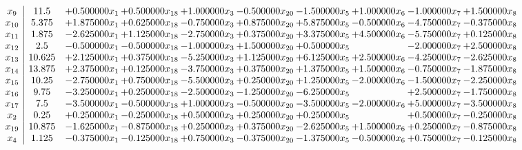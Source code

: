 \documentclass[10pt]{article}
\begin{document}
 \[\begin{array}{c| c c@{\hskip 2pt} c@{\hskip 2pt} c@{\hskip 2pt} c@{\hskip 2pt} c@{\hskip 2pt} c@{\hskip 2pt} c@{\hskip 2pt} c@{\hskip 2pt} }
 x_{9}   &  11.5 & + 0.500000 x_{1} & + 0.500000 x_{18} & + 1.000000 x_{3} & -0.500000 x_{20} & -1.500000 x_{5} & + 1.000000 x_{6} & -1.000000 x_{7} & + 1.500000 x_{8}\\
 x_{10}   &  5.375 & + 1.875000 x_{1} & + 0.625000 x_{18} & -0.750000 x_{3} & + 0.875000 x_{20} & + 5.875000 x_{5} & -0.500000 x_{6} & -4.750000 x_{7} & -0.375000 x_{8}\\
 x_{11}   &  1.875 & -2.625000 x_{1} & + 1.125000 x_{18} & -2.750000 x_{3} & + 0.375000 x_{20} & + 3.375000 x_{5} & + 4.500000 x_{6} & -5.750000 x_{7} & + 0.125000 x_{8}\\
 x_{12}   &  2.5 & -0.500000 x_{1} & -0.500000 x_{18} & -1.000000 x_{3} & + 1.500000 x_{20} & + 0.500000 x_{5} &   & -2.000000 x_{7} & + 2.500000 x_{8}\\
 x_{13}   &  10.625 & + 2.125000 x_{1} & + 0.375000 x_{18} & -5.250000 x_{3} & + 1.125000 x_{20} & + 6.125000 x_{5} & + 2.500000 x_{6} & -4.250000 x_{7} & -2.625000 x_{8}\\
 x_{14}   &  13.875 & + 2.375000 x_{1} & + 0.125000 x_{18} & -3.750000 x_{3} & + 0.375000 x_{20} & + 1.375000 x_{5} & + 1.500000 x_{6} & -0.750000 x_{7} & -1.875000 x_{8}\\
 x_{15}   &  10.25 & -2.750000 x_{1} & + 0.750000 x_{18} & -5.500000 x_{3} & + 0.250000 x_{20} & + 1.250000 x_{5} & -2.000000 x_{6} & -1.500000 x_{7} & -2.250000 x_{8}\\
 x_{16}   &  9.75 & -3.250000 x_{1} & + 0.250000 x_{18} & -2.500000 x_{3} & -1.250000 x_{20} & -6.250000 x_{5} &   & + 2.500000 x_{7} & -1.750000 x_{8}\\
 x_{17}   &  7.5 & -3.500000 x_{1} & -0.500000 x_{18} & + 1.000000 x_{3} & -0.500000 x_{20} & -3.500000 x_{5} & -2.000000 x_{6} & + 5.000000 x_{7} & -3.500000 x_{8}\\
 x_{2}   &  0.25 & + 0.250000 x_{1} & -0.250000 x_{18} & + 0.500000 x_{3} & + 0.250000 x_{20} & + 0.250000 x_{5} &   & + 0.500000 x_{7} & -0.250000 x_{8}\\
 x_{19}   &  10.875 & -1.625000 x_{1} & -0.875000 x_{18} & + 0.250000 x_{3} & + 0.375000 x_{20} & -2.625000 x_{5} & + 1.500000 x_{6} & + 0.250000 x_{7} & -0.875000 x_{8}\\
 x_{4}   &  1.125 & -0.375000 x_{1} & -0.125000 x_{18} & + 0.750000 x_{3} & -0.375000 x_{20} & -1.375000 x_{5} & -0.500000 x_{6} & + 0.750000 x_{7} & -0.125000 x_{8}\\

\end{array}\]
\end{document}
